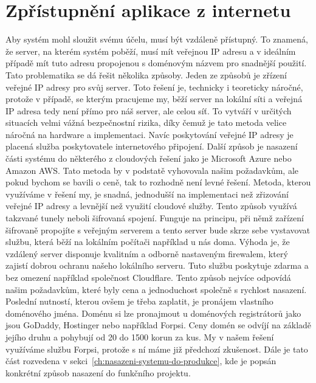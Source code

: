 \section{Zpřístupnění aplikace z internetu}\label{sec:zpristupneni-aplikace-z-internetu}
Aby systém mohl sloužit svému účelu, musí být vzdáleně přístupný.
To znamená, že server, na kterém systém poběží, musí mít veřejnou IP adresu a v ideálním případě mít tuto adresu propojenou s doménovým názvem pro snadnější použití.
Tato problematika se dá řešit několika způsoby.\newline
Jeden ze způsobů je zřízení veřejné IP adresy pro svůj server.
Toto řešení je, technicky i teoreticky náročné, protože v případě, se kterým pracujeme my, běží server na lokální síti a veřejná IP adresa tedy není přímo pro náš server, ale celou síť.
To vytváří v určitých situacích velmi vážná bezpečnostní rizika, díky čemuž je tato metoda velice náročná na hardware a implementaci.
Navíc poskytování veřejné IP adresy je placená služba poskytovatele internetového připojení.\newline
Další způsob je nasazení části systému do některého z cloudových řešení jako je Microsoft Azure nebo Amazon AWS.
Tato metoda by v podstatě vyhovovala našim požadavkům, ale pokud bychom se bavili o ceně, tak to rozhodně není levné řešení. \newline
Metoda, kterou využíváme v řešení my, je snadná, jednodušší na implementaci než zřizování veřejné IP adresy a levnější než využití cloudové služby.
Tento způsob využívá takzvané tunely neboli šifrovaná spojení.
Funguje na principu, při němž zařízení šifrovaně propojíte s veřejným serverem a tento server bude skrze sebe vystavovat službu, která běží na lokálním počítači například u nás doma.
Výhoda je, že vzdálený server disponuje kvalitním a odborně nastaveným firewalem, který zajistí dobrou ochranu našeho lokálního serveru.
Tuto službu poskytuje zdarma a bez omezení například společnost Cloudflare.
Tento způsob nejvíce odpovídá našim požadavkům, které byly cena a jednoduchost společně s rychlost nasazení.\newline
Poslední nutností, kterou ovšem je třeba zaplatit, je pronájem vlastního doménového jména.
Doménu si lze pronajmout u doménových registrátorů jako jsou GoDaddy, Hostinger nebo například Forpsi.
Ceny domén se odvíjí na základě jejího druhu a pohybují od 20 do 1500 korun za kus.
My v našem řešení využíváme službu Forpsi, protože s ní máme již předchozí zkušenost.\newline
Dále je tato část rozvedena v sekci~\ref{ch:nasazeni-systemu-do-produkce}, kde je popsán konkrétní způsob nasazení do funkčního projektu.

\newpage